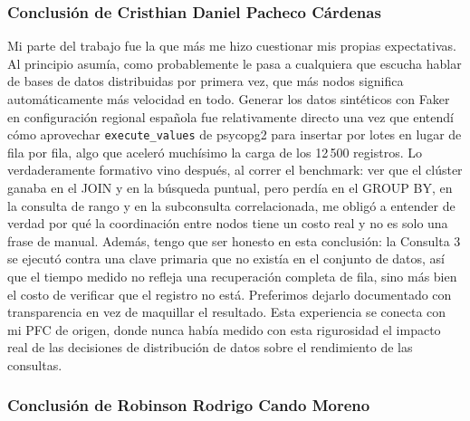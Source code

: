 \documentclass[12pt, a4paper]{article}
\begin{document}
\subsubsection*{Conclusión de Cristhian Daniel Pacheco Cárdenas}

Mi parte del trabajo fue la que más me hizo cuestionar mis propias expectativas. Al principio asumía, como probablemente le pasa a cualquiera que escucha hablar de bases de datos distribuidas por primera vez, que más nodos significa automáticamente más velocidad en todo. Generar los datos sintéticos con Faker en configuración regional española fue relativamente directo una vez que entendí cómo aprovechar \texttt{execute\_values} de psycopg2 para insertar por lotes en lugar de fila por fila, algo que aceleró muchísimo la carga de los 12\,500 registros. Lo verdaderamente formativo vino después, al correr el benchmark: ver que el clúster ganaba en el JOIN y en la búsqueda puntual, pero perdía en el GROUP BY, en la consulta de rango y en la subconsulta correlacionada, me obligó a entender de verdad por qué la coordinación entre nodos tiene un costo real y no es solo una frase de manual. Además, tengo que ser honesto en esta conclusión: la Consulta 3 se ejecutó contra una clave primaria que no existía en el conjunto de datos, así que el tiempo medido no refleja una recuperación completa de fila, sino más bien el costo de verificar que el registro no está. Preferimos dejarlo documentado con transparencia en vez de maquillar el resultado. Esta experiencia se conecta con mi PFC de origen, donde nunca había medido con esta rigurosidad el impacto real de las decisiones de distribución de datos sobre el rendimiento de las consultas.

\subsubsection*{Conclusión de Robinson Rodrigo Cando Moreno}
\end{document}
